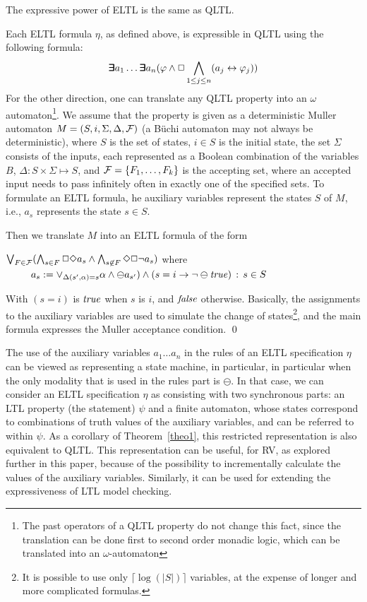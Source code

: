 \begin{theorem}
\label{theo1}
The expressive power of 
ELTL is the same as QLTL.
\end{theorem}
Each ELTL formula $\eta$, as defined above,
is expressible in QLTL using the following formula:
\[   \bm{\exists}\kern-0.6em\bm{\exists} a_1 \ldots \bm{\exists}\kern-0.6em\bm{\exists} a_n  ( \varphi  \wedge   \Box \bigwedge_{1 \leq j \leq n} ( a_j \leftrightarrow \varphi_j))
\]
For the other direction, one can translate any QLTL property into an $\omega$ automaton\footnote{The past operators of a QLTL property do not change this fact, since the translation can be done first to second order monadic logic, which can be translated into an $\omega$-automaton}.
We assume that the property is given as a deterministic Muller automaton $M = (S, i , \Sigma, \Delta, {\cal F})$ (a B\"{u}chi automaton may not always be deterministic), where $S$ is the set of states, $i \in S$ is the initial state, the set $\Sigma$ consists of the inputs, each represented as a Boolean combination of the variables $B$, $\Delta : S \times \Sigma \mapsto S$, and ${\cal F} = \{ F_1 , \ldots , F_k \}$ is the accepting set, 
where an accepted input needs to pass infinitely often in exactly
one of the specified sets. To formulate an ELTL formula,
he auxiliary variables represent the states $S$ of $M$, i.e., $a_s$ represents the state $s \in S$.

Then we translate $M$ into an ELTL formula
of the form \begin{tabbing}
$\bigvee_{F \in {\cal F}} (\bigwedge_{s \in F} \Box\Diamond a_s \wedge \bigwedge_{s \not\in F} \Diamond \Box \neg a_s)$
where \\
\ \ \ \ \ $a_s := \vee _{\Delta ( s'
, \alpha ) = s } 
\alpha \wedge \ominus a_{s'} )
\wedge (s=i \rightarrow \neg \ominus \mathit{true})
\, :\,  s \in S
$
\end{tabbing}
With $(s=i)$ is $\mathit{true}$ when $s$ is $i$, and $\mathit{false}$ otherwise.
Basically, the assignments to the auxiliary variables are used to simulate the change of states\footnote{It is possible to use only $\lceil \log ( | S | ) \rceil$
variables, at the expense of longer and more complicated formulas.}, and the main formula expresses the Muller acceptance condition. \qed

The use of the auxiliary variables $a_1 \ldots a_n$ in the
rules of an ELTL specification 
$\eta$ can be viewed as representing a
state machine, in particular, in
particular when the only modality that is used in the rules part is $\ominus$.
In that case, we can consider an ELTL specification $\eta$ as consisting with two synchronous parts: an LTL property 
(the statement) $\psi$
and a finite automaton, whose states correspond to combinations
of truth values of the auxiliary variables, and can be referred to
within $\psi$. As a corollary of Theorem~\ref{theo1}, 
this restricted representation is also equivalent to QLTL.
This representation can be useful, for RV, as explored further in this paper, because of the possibility to
incrementally calculate the values of the auxiliary variables. 
Similarly, it can be
used for extending the expressiveness of LTL model checking.

